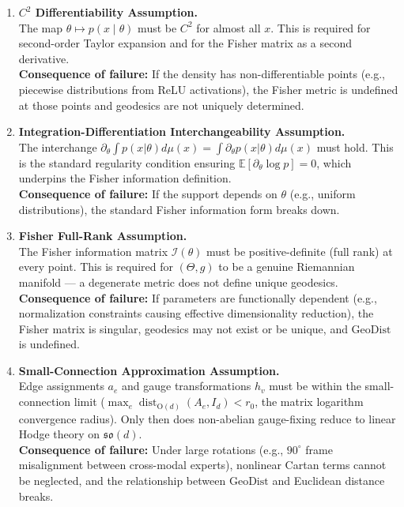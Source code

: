 \documentclass{article}
\newcommand{\GeoDist}{\mathrm{GeoDist}}
\newcommand{\Fisher}{\mathcal{I}}
\newcommand{\Od}{\mathrm{O}(d)}
\newcommand{\E}{\mathbb{E}}
\DeclareMathOperator{\dist}{dist}
\begin{document}
\begin{enumerate}[label=\textbf{H\arabic*:}, leftmargin=*, itemsep=0.8em]
    \item \textbf{$C^2$ Differentiability Assumption.} \\
    The map $\theta \mapsto p(x \mid \theta)$ must be $C^2$ for almost all $x$.
    This is required for second-order Taylor expansion and for the Fisher matrix as a second derivative.
    \\[0.3em]
    \textbf{Consequence of failure:} If the density has non-differentiable points (e.g., piecewise
    distributions from ReLU activations), the Fisher metric is undefined at those points and
    geodesics are not uniquely determined.

    \item \textbf{Integration-Differentiation Interchangeability Assumption.} \\
    The interchange $\partial_\theta \int p(x|\theta) d\mu(x) = \int \partial_\theta p(x|\theta) d\mu(x)$
    must hold. This is the standard regularity condition ensuring $\E[\partial_\theta \log p] = 0$, which
    underpins the Fisher information definition.
    \\[0.3em]
    \textbf{Consequence of failure:} If the support depends on $\theta$ (e.g., uniform distributions),
    the standard Fisher information form breaks down.

    \item \textbf{Fisher Full-Rank Assumption.} \\
    The Fisher information matrix $\Fisher(\theta)$ must be positive-definite
    (full rank) at every point. This is required for $(\Theta, g)$ to be a genuine Riemannian
    manifold — a degenerate metric does not define unique geodesics.
    \\[0.3em]
    \textbf{Consequence of failure:} If parameters are functionally dependent (e.g., normalization
    constraints causing effective dimensionality reduction), the Fisher matrix is singular,
    geodesics may not exist or be unique, and $\GeoDist$ is undefined.

    \item \textbf{Small-Connection Approximation Assumption.} \\
    Edge assignments $a_e$ and gauge transformations $h_v$ must be within the
    small-connection limit ($\max_e \dist_{\Od}(A_e, I_d) < r_0$, the matrix logarithm convergence radius).
    Only then does non-abelian gauge-fixing reduce to linear Hodge theory on $\mathfrak{so}(d)$.
    \\[0.3em]
    \textbf{Consequence of failure:} Under large rotations (e.g., $90^\circ$ frame misalignment
    between cross-modal experts), nonlinear Cartan terms cannot be neglected, and the relationship
    between $\GeoDist$ and Euclidean distance breaks.


\end{enumerate}
\end{document}
